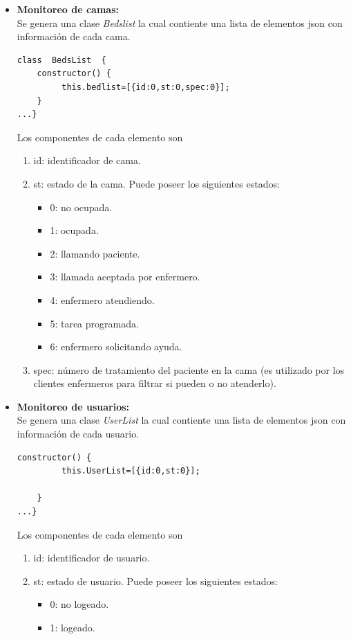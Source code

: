 \begin{itemize}

\item \textbf{ Monitoreo de camas:}\\
Se genera una clase \textit{Bedslist} la cual contiente una lista de elementos json con información de cada cama.

\begin{lstlisting}[caption=  Clase Bedlist]
class  BedsList  {    
    constructor() {
         this.bedlist=[{id:0,st:0,spec:0}];                        
    }
...}
\end{lstlisting}

Los componentes de cada elemento son 
\begin{enumerate}
\item id: identificador de cama.
\item st: estado de la cama. Puede poseer los siguientes estados: 
\begin{itemize}
\item 0: no ocupada.
\item 1: ocupada.
\item 2: llamando paciente.
\item 3: llamada aceptada por enfermero.
\item 4: enfermero atendiendo.
\item 5: tarea programada.
\item 6: enfermero solicitando ayuda.
\end{itemize}
\item spec: número de tratamiento del paciente en la cama (es utilizado por los clientes enfermeros para filtrar si pueden o no atenderlo).
\end{enumerate}

\item \textbf{ Monitoreo de usuarios:}\\
Se genera una clase \textit{UserList} la cual contiente una lista de elementos json con información de cada usuario.

\begin{lstlisting}[caption=  Clase Userlist]
constructor() {
         this.UserList=[{id:0,st:0}];                
        
    }
...}
\end{lstlisting}

Los componentes de cada elemento son 
	\begin{enumerate}
		\item id: identificador de usuario.
		\item st: estado de usuario. Puede poseer los siguientes estados: 
			\begin{itemize}
				\item 0: no logeado.
				\item 1: logeado.
			\end{itemize}
	\end{enumerate}





\end{itemize}

